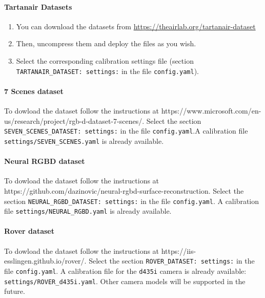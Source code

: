 \documentclass{article}
\providecommand{\tightlist}{%
  \setlength{\itemsep}{0pt}\setlength{\parskip}{0pt}}
\let\oldparagraph\paragraph
\renewcommand{\paragraph}[1]{\oldparagraph{#1}\mbox{}}
\begin{document}
\hypertarget{tartanair-datasets}{%
\paragraph{Tartanair Datasets}\label{tartanair-datasets}}

\begin{enumerate}
\def\labelenumi{\arabic{enumi}.}
\tightlist
\item
  You can download the datasets from
  \href{https://theairlab.org/tartanair-dataset}{https://theairlab.org/tartanair-dataset}
\item
  Then, uncompress them and deploy the files as you wish.
\item
  Select the corresponding calibration settings file (section
  \texttt{TARTANAIR\_DATASET:\ settings:} in the file
  \texttt{config.yaml}).
\end{enumerate}

\hypertarget{scenes-dataset}{%
\paragraph{7 Scenes dataset}\label{scenes-dataset}}

To dowload the dataset follow the instructions at
https://www.microsoft.com/en-us/research/project/rgb-d-dataset-7-scenes/.
Select the section \texttt{SEVEN\_SCENES\_DATASET:\ settings:} in the
file \texttt{config.yaml}.A calibration file
\texttt{settings/SEVEN\_SCENES.yaml} is already available.

\hypertarget{neural-rgbd-dataset}{%
\paragraph{Neural RGBD dataset}\label{neural-rgbd-dataset}}

To dowload the dataset follow the instructions at
https://github.com/dazinovic/neural-rgbd-surface-reconstruction. Select
the section \texttt{NEURAL\_RGBD\_DATASET:\ settings:} in the file
\texttt{config.yaml}. A calibration file
\texttt{settings/NEURAL\_RGBD.yaml} is already available.

\hypertarget{rover-dataset}{%
\paragraph{Rover dataset}\label{rover-dataset}}

To dowload the dataset follow the instructions at
https://iis-esslingen.github.io/rover/. Select the section
\texttt{ROVER\_DATASET:\ settings:} in the file \texttt{config.yaml}. A
calibration file for the \texttt{d435i} camera is already available:
\texttt{settings/ROVER\_d435i.yaml}. Other camera models will be
supported in the future.
\end{document}
